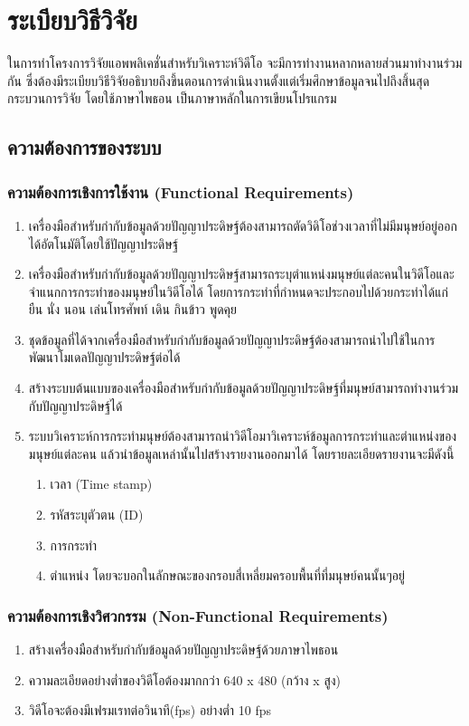 \chapter{ระเบียบวิธีวิจัย}
ในการทําโครงการวิจัยแอพพลิเคชั่นสำหรับวิเคราะห์วิดีโอ จะมีการทำงานหลากหลายส่วนมาทำงานร่วมกัน 
ซึ่งต้องมีระเบียบวิธีวิจัยอธิบายถึงขึ้นตอนการดำเนินงานตั้งแต่เริ่มศึกษาข้อมูลจนไปถึงสิ้นสุดกระบวนการวิจัย
โดยใช้ภาษาไพธอน เป็นภาษาหลักในการเขียนโปรแกรม

\section{ความต้องการของระบบ}
\subsection{ความต้องการเชิงการใช้งาน (Functional Requirements)}
\begin{enumerate}
	\setlength\itemsep{-0.25em}
    \item เครื่องมือสำหรับกำกับข้อมูลด้วยปัญญาประดิษฐ์ต้องสามารถตัดวิดิโอช่วงเวลาที่ไม่มีมนุษย์อยู่ออกได้อัตโนมัติโดยใช้ปัญญาประดิษฐ์ 
	\item เครื่องมือสำหรับกำกับข้อมูลด้วยปัญญาประดิษฐ์สามารถระบุตำแหน่งมนุษย์แต่ละคนในวิดีโอและจำแนกการกระทำของมนุษย์ในวิดีโอได้ 
	โดยการกระทำที่กำหนดจะประกอบไปด้วยกระทำได้แก่ ยืน นั่ง นอน เล่นโทรศัพท์ เดิน กินข้าว พูดคุย
	\item ชุดข้อมูลที่ได้จากเครื่องมือสำหรับกำกับข้อมูลด้วยปัญญาประดิษฐ์ต้องสามารถนำไปใช้ในการพัฒนาโมเดลปัญญาประดิษฐ์ต่อได้ 
	\item สร้างระบบต้นแบบของเครื่องมือสำหรับกำกับข้อมูลด้วยปัญญาประดิษฐ์ที่มนุษย์สามารถทำงานร่วมกับปัญญาประดิษฐ์ได้
	\item ระบบวิเคราะห์การกระทำมนุษย์ต้องสามารถนำวิดีโอมาวิเคราะห์ข้อมูลการกระทำและตำแหน่งของมนุษย์แต่ละคน แล้วนำข้อมูลเหล่านั้นไปสร้างรายงานออกมาได้ โดยรายละเอียดรายงานจะมีดังนี้
	\begin{enumerate}
		\item เวลา (Time stamp)
		\item รหัสระบุตัวตน (ID)
		\item การกระทำ
		\item ตำแหน่ง โดยจะบอกในลักษณะของกรอบสี่เหลี่ยมครอบพื้นที่ที่มนุษย์คนนั้นๆอยู่
	\end{enumerate}
\end{enumerate}
\subsection{ความต้องการเชิงวิศวกรรม (Non-Functional Requirements)}
\begin{enumerate}
	\item สร้างเครื่องมือสำหรับกำกับข้อมูลด้วยปัญญาประดิษฐ์ด้วยภาษาไพธอน
	\item ความละเอียดอย่างต่ำของวิดีโอต้องมากกว่า 640 x 480 (กว้าง x สูง) 
	\item วิดีโอจะต้องมีเฟรมเรทต่อวินาที(fps) อย่างต่ำ 10 fps
\end{enumerate}
\clearpage

